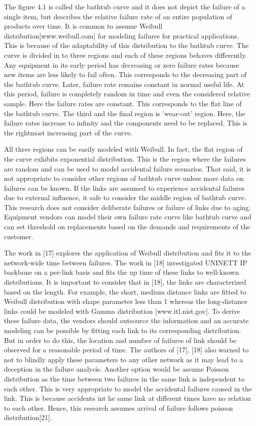 The figure 4.1 is called the bathtub curve and it does not depict the failure of a single item, but describes the relative failure rate of an entire population of products over time. It is common to assume Weibull distribution[www.weibull.com] for modeling failures for practical applications. This is because of the adaptability of this distribution to the bathtub curve. The curve is divided in to three regions and each of these regions behaves differently. Any equipment in its early period has decreasing or zero failure rates because new items are less likely to fail often. This corresponds to the decreasing part of the bathtub curve. Later, failure rate remains constant in normal useful life. At this period, failure is completely random in time and even the considered relative sample.  Here the failure rates are constant. This corresponds to the flat line of the bathtub curve. The third and the final region is 'wear-out' region. Here, the failure rates increase to infinity and the components need to be replaced. This is the rightmost increasing part of the curve.
	
\indent All three regions can be easily modeled with Weibull. In fact, the flat region of the curve exhibits exponential distribution. This is the region where the failures are random and can be used to model accidental failure scenarios. That said, it is not appropriate to consider other regions of bathtub curve unless more data on failures can be known. If the links are assumed to experience accidental failures due to external influence, it safe to consider the middle region of bathtub curve. This research does not consider deliberate failures or failure of links due to aging. Equipment vendors can model their own failure rate curve like bathtub curve and can set threshold on replacements based on the demands and requirements of the customer. 

\indent The work in [17] explores the application of Weibull distribution and fits it to the network-wide time between failures. The work in [18] investigated UNINETT IP backbone on a per-link basis and fits the up time of these links to well-known distributions. It is important to consider that in [18], the links are characterized based on the length. For example, the short, medium distance links are fitted to Weibull distribution with shape parameter less than 1 whereas the long-distance links could be modeled with Gamma distribution [www.itl.nist.gov]. To derive these failure data, the vendors should outsource the information and an accurate modeling can be possible by fitting each link to its corresponding distribution. But in order to do this, the location and number of failures of link should be observed for a reasonable period of time. The authors of [17], [18] also warned to not to blindly apply these parameters to any other network as it may lead to a deception in the failure analysis. Another option would be assume Poisson distribution as the time between two failures in the same link is independent to each other. This is very appropriate to model the accidental failures caused in the link. This is because accidents int he same link at different times have no relation to each other. Hence, this research assumes arrival of failure follows poisson distribution[21].  

